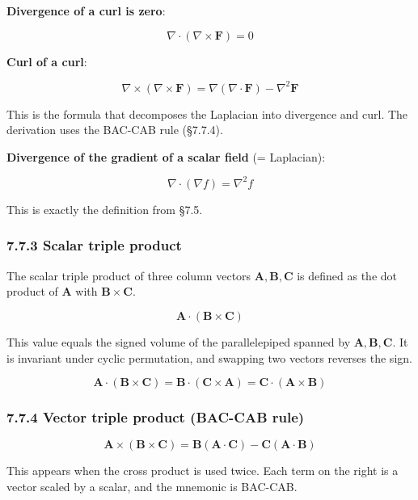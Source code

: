 \documentclass[a4paper,12pt,openany]{book}
\begin{document}
\textbf{Divergence of a curl is zero}:

\[\nabla \cdot (\nabla \times \mathbf{F}) = 0\]

\textbf{Curl of a curl}:

\[\nabla \times (\nabla \times \mathbf{F}) = \nabla(\nabla \cdot \mathbf{F}) - \nabla^2 \mathbf{F}\]

This is the formula that decomposes the Laplacian into divergence and
curl. The derivation uses the BAC-CAB rule (§7.7.4).

\textbf{Divergence of the gradient of a scalar field} (= Laplacian):

\[\nabla \cdot (\nabla f) = \nabla^2 f\]

This is exactly the definition from §7.5.

\hypertarget{scalar-triple-product}{%
\subsubsection{7.7.3 Scalar triple
product}\label{scalar-triple-product}}

The scalar triple product of three column vectors
\(\mathbf{A}, \mathbf{B}, \mathbf{C}\) is defined as the dot product of
\(\mathbf{A}\) with \(\mathbf{B}\times\mathbf{C}\).

\[\mathbf{A} \cdot (\mathbf{B} \times \mathbf{C})\]

This value equals the signed volume of the parallelepiped spanned by
\(\mathbf{A}, \mathbf{B}, \mathbf{C}\). It is invariant under cyclic
permutation, and swapping two vectors reverses the sign.

\[\mathbf{A} \cdot (\mathbf{B} \times \mathbf{C}) = \mathbf{B} \cdot (\mathbf{C} \times \mathbf{A}) = \mathbf{C} \cdot (\mathbf{A} \times \mathbf{B})\]

\hypertarget{vector-triple-product-bac-cab-rule}{%
\subsubsection{7.7.4 Vector triple product (BAC-CAB
rule)}\label{vector-triple-product-bac-cab-rule}}

\[\mathbf{A} \times (\mathbf{B} \times \mathbf{C}) = \mathbf{B}(\mathbf{A} \cdot \mathbf{C}) - \mathbf{C}(\mathbf{A} \cdot \mathbf{B})\]

This appears when the cross product is used twice. Each term on the
right is a vector scaled by a scalar, and the mnemonic is BAC-CAB.
\end{document}
